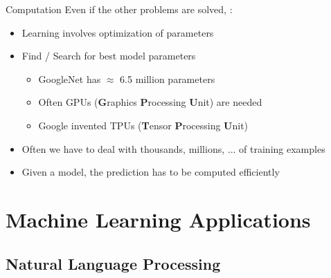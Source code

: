 \begin{frame}{Computation}{}
	Even if the other problems are solved, :
	\begin{itemize}
		\item Learning involves optimization of parameters
		\item Find / Search for best model parameters
		\begin{itemize}
			\item GoogleNet has $\approx$ 6.5 million parameters
			\item Often GPUs (\textbf{G}raphics \textbf{P}rocessing \textbf{U}nit) are needed
			\item Google invented TPUs (\textbf{T}ensor \textbf{P}rocessing \textbf{U}nit)
		\end{itemize}
		\item Often we have to deal with thousands, millions, ... of training examples
		\item Given a model, the prediction has to be computed efficiently
	\end{itemize}
\end{frame}


\section{Machine Learning Applications}

\subsection{Natural Language Processing}

